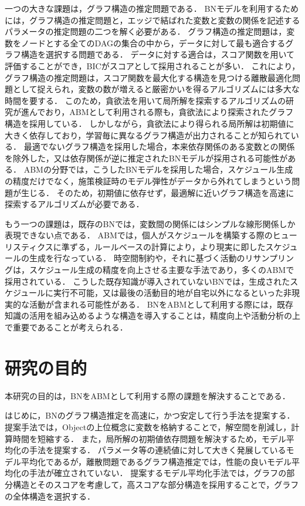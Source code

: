 一つの大きな課題は，グラフ構造の推定問題である．
BNモデルを利用するためには，グラフ構造の推定問題と，エッジで結ばれた変数と変数の関係を記述するパラメータの推定問題の二つを解く必要がある．
グラフ構造の推定問題は，変数をノードとする全てのDAGの集合の中から，データに対して最も適合するグラフ構造を選択する問題である．
データに対する適合は，スコア関数を用いて評価することができ，BICがスコアとして採用されることが多い．
これにより，グラフ構造の推定問題は，スコア関数を最大化する構造を見つける離散最適化問題として捉えられ，変数の数が増えると厳密かいを得るアルゴリズムには多大な時間を要する．
このため，貪欲法を用いて局所解を探索するアルゴリズムの研究が進んでおり，ABMとして利用される際も，貪欲法により探索されたグラフ構造を採用している．
しかしながら，貪欲法により得られる局所解は初期値に大きく依存しており，学習毎に異なるグラフ構造が出力されることが知られている．
最適でないグラフ構造を採用した場合，本来依存関係のある変数との関係を除外した，又は依存関係が逆に推定されたBNモデルが採用される可能性がある．
ABMの分野では，こうしたBNモデルを採用した場合，スケジュール生成の精度だけでなく，施策検証時のモデル弾性がデータから外れてしまうという問題が生じる．
そのため，初期値に依存せず，最適解に近いグラフ構造を高速に探索するアルゴリズムが必要である．

もう一つの課題は，既存のBNでは，変数間の関係にはシンプルな線形関係しか表現できない点である．
ABMでは，個人がスケジュールを構築する際のヒューリスティクスに準ずる，ルールベースの計算により，より現実に即したスケジュールの生成を行なっている．
時空間制約や，それに基づく活動のリサンプリングは，スケジュール生成の精度を向上させる主要な手法であり，多くのABMで採用されている．
こうした既存知識が導入されていないBNでは，生成されたスケジュールに実行不可能，又は最後の活動目的地が自宅以外になるといった非現実的な活動が含まれる可能性がある．
BNをABMとして利用する際には，既存知識の活用を組み込めるような構造を導入することは，精度向上や活動分析の上で重要であることが考えられる．

\section{研究の目的}\label{1.2}
本研究の目的は，BNをABMとして利用する際の課題を解決することである．

はじめに，BNのグラフ構造推定を高速に，かつ安定して行う手法を提案する．
提案手法では，Objectの上位概念に変数を格納することで，解空間を削減し，計算時間を短縮する．
また，局所解の初期値依存問題を解決するため，モデル平均化の手法を提案する．
パラメータ等の連続値に対して大きく発展しているモデル平均化であるが，離散問題であるグラフ構造推定では，性能の良いモデル平均化の手法が確立されていない．
提案するモデル平均化手法では，グラフの部分構造とそのスコアを考慮して，高スコアな部分構造を採用することで，グラフの全体構造を選択する．

